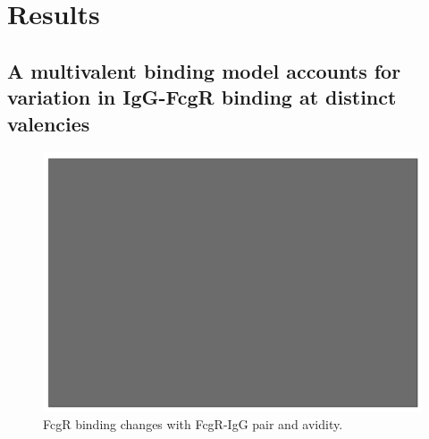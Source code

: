\section{Results}

\subsection{A multivalent binding model accounts for variation in IgG-FcgR binding at distinct valencies}





\begin{figure}[hbt]
  \centering
  \includegraphics[width=5in]{./Figures/Fig1-BindingData.pdf}
  \caption{FcgR binding changes with FcgR-IgG pair and avidity. }
\end{figure}










\subsection{}











\subsection{}




